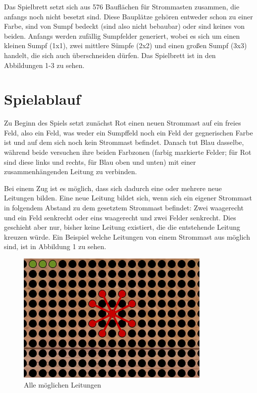 \documentclass[a4paper, ngerman]{scrartcl}
\begin{document}
Das Spielbrett setzt sich aus 576 Bauflächen für Strommasten zusammen,
die anfangs noch nicht besetzt sind.  Diese Bauplätze gehören entweder
schon zu einer Farbe, sind von Sumpf bedeckt (sind also nicht
bebaubar) oder sind keines von beiden.  Anfangs werden zufällig
Sumpfelder generiert, wobei es sich um einen kleinen Sumpf (1x1), zwei
mittlere Sümpfe (2x2) und einen großen Sumpf (3x3) handelt, die sich
auch überschneiden dürfen. Das Spielbrett ist in den Abbildungen 1-3
zu sehen.

\section{Spielablauf}

Zu Beginn des Spiels setzt zunächst Rot einen neuen Strommast auf ein
freies Feld, also ein Feld, was weder ein Sumpffeld noch ein Feld der
gegnerischen Farbe ist und auf dem sich noch kein Strommast
befindet. Danach tut Blau dasselbe, während beide versuchen ihre
beiden Farbzonen (farbig markierte Felder; für Rot sind diese links
und rechts, für Blau oben und unten) mit einer zusammenhängenden
Leitung zu verbinden.

Bei einem Zug ist es möglich, dass sich dadurch eine oder mehrere neue
Leitungen bilden. Eine neue Leitung bildet sich, wenn sich ein eigener
Strommast in folgendem Abstand zu dem gesetztem Strommast befindet:
Zwei waagerecht und ein Feld senkrecht oder eins waagerecht und zwei
Felder senkrecht. Dies geschieht aber nur, bisher keine Leitung
existiert, die die entstehende Leitung kreuzen würde.  Ein Beispiel
welche Leitungen von einem Strommast aus möglich sind, ist in
Abbildung 1 zu sehen.

\begin{figure}[h!]
  \centering
  \includegraphics[scale = 0.8]{bilder/setzzug.png}
  \caption{Alle möglichen Leitungen}
  \label{fig:Leitungen}
\end{figure}
\end{document}
